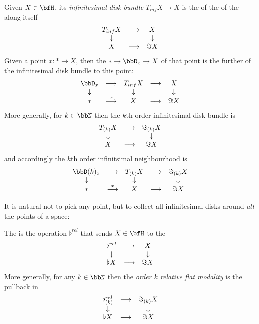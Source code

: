 \begin{defn}
\label{InfinitesimalDiskBundle}\hypertarget{InfinitesimalDiskBundle}{}
Given $X \in \bfH$, its \emph{infinitesimal disk bundle} $T_{inf} X\to X$ is the  of the  of the  along itself
\begin{displaymath}
\begin{matrix}
T_{inf} X &\stackrel{}{\longrightarrow}& X
\\
\downarrow && \downarrow
\\
X &\longrightarrow& \Im X
\end{matrix}
\end{displaymath}
Given a point $x \colon  \ast \to X$, then the  $\ast \to \bbD_x \to X$ of that point is the further  of the infinitesimal disk bundle to this point:
\begin{displaymath}
\itexarray{
\bbD_x &\longrightarrow & T_{inf} X &\stackrel{}{\longrightarrow}& X
\\
\downarrow && \downarrow && \downarrow
\\
\ast &\stackrel{x}{\longrightarrow} & X &\longrightarrow& \Im X
}
\end{displaymath}
More generally, for $k \in \bbN$ then the $k$th order infinitesimal disk bundle is
\begin{displaymath}
\begin{matrix}
T_{(k)} X &\stackrel{}{\longrightarrow}& \Im_{(k)} X
\\
\downarrow && \downarrow
\\
X &\longrightarrow& \Im X
\end{matrix}
\end{displaymath}
and accordingly the $k$th order infinitsimal neighbourhood is
\begin{displaymath}
\itexarray{
\bbD(k)_x &\longrightarrow & T_{(k)} X &\stackrel{}{\longrightarrow}& \Im_{(k)}X
\\
\downarrow && \downarrow && \downarrow
\\
\ast &\stackrel{x}{\longrightarrow} & X &\longrightarrow& \Im X
}
\end{displaymath}
\end{defn}
It is natural not to pick any point, but to collect all infinitesimal disks around \emph{all} the points of a space:
\begin{defn}
\label{RelativeFlat}\hypertarget{RelativeFlat}{}
The  is the operation $\flat^{rel}$ that sends $X \in \bfH$ to the 
\begin{displaymath}
\begin{matrix}
\flat^{rel} &\longrightarrow& X
\\
\downarrow && \downarrow
\\
\flat X &\longrightarrow& \Im X
\end{matrix}
\end{displaymath}
More generally, for any $k \in \bbN$ then the \emph{order $k$ relative flat modality} is the pullback in
\begin{displaymath}
\begin{matrix}
\flat^{rel}_{(k)} &\longrightarrow& \Im_{(k)} X
\\
\downarrow && \downarrow
\\
\flat X &\longrightarrow& \Im X
\end{matrix}
\end{displaymath}
\end{defn}
